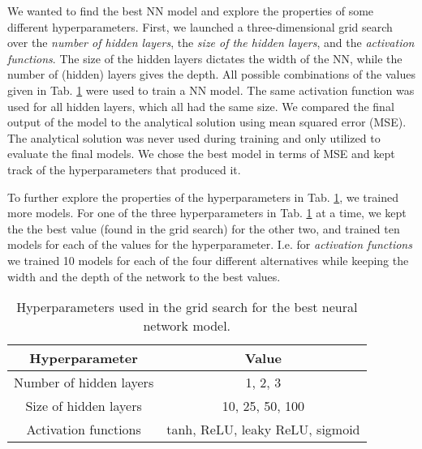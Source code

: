 
We wanted to find the best NN model and explore the properties of some different hyperparameters. 
First, we launched a three-dimensional grid search over the \textit{number of hidden layers}, the \textit{size of the hidden layers}, and the \textit{activation functions}. 
The size of the hidden layers dictates the width of the NN, while the number of (hidden) layers gives the depth. 
All possible combinations of the values given in Tab. \ref{tab:hyperparams} were used to train a NN model. 
The same activation function was used for all hidden layers, which all had the same size. 
We compared the final output of the model to the analytical solution using mean squared error (MSE). 
The analytical solution was never used during training and only utilized to evaluate the final models. 
We chose the best model in terms of MSE and kept track of the hyperparameters that produced it. 

To further explore the properties of the hyperparameters in Tab. \ref{tab:hyperparams}, we trained more models. 
For one of the three hyperparameters in Tab. \ref{tab:hyperparams} at a time, we kept the the best value (found in the grid search) for the other two, and trained ten models for each of the values for the hyperparameter. 
I.e. for \textit{activation functions} we trained 10 models for each of the four different alternatives while keeping the width and the depth of the network to the best values. 


\begin{table}[h!]
    \centering
    \begin{tabular}{|c|c|}
    \hline
        \textbf{Hyperparameter} & \textbf{Value}  \\ \hline
        Number of hidden layers & 1, 2, 3  \\ \hline
        Size of hidden layers & 10, 25, 50, 100 \\\hline
        Activation functions & tanh, ReLU, leaky ReLU, sigmoid \\ \hline
    \end{tabular}
    \caption{Hyperparameters used in the grid search for the best neural network model.}
    \label{tab:hyperparams}
\end{table}
